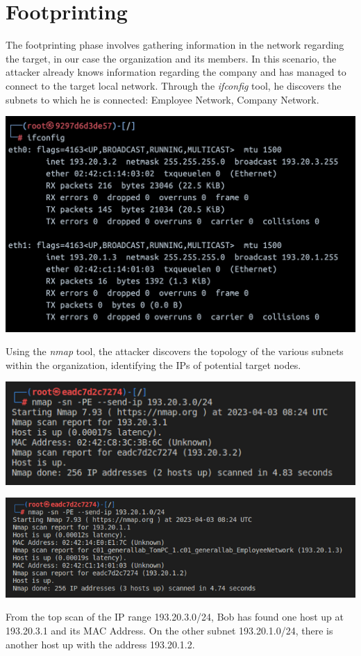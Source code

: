 \documentclass[a4paper, 12pt, oneside]{extbook}
\begin{document}
\chapter{Footprinting}
The footprinting phase involves gathering information in the network regarding the target, in our case the organization and its members.
\newline In this scenario, the attacker already knows information regarding the company and has managed to connect to the target local network.
\newline Through the \textit{ifconfig} tool, he discovers the subnets to which he is connected: Employee Network, Company Network.
\begin{center}
  \includegraphics[scale=0.6]{../Image/ifconfig_bob.png}
\end{center}

Using the \textit{nmap} tool, the attacker discovers the topology of the various subnets within the organization, identifying the IPs of potential target nodes.
\begin{center}
\includegraphics[scale=1]{../Image/footprinting_company_network.png}
\end{center}
\begin{center}
\includegraphics[scale=0.76]{../Image/footprinting_employee_network.png}
\end{center}
From the top scan of the IP range 193.20.3.0/24, Bob has found one host up at 193.20.3.1 and its MAC Address. On the other subnet 193.20.1.0/24, there is another host up with the address 193.20.1.2.
\end{document}
